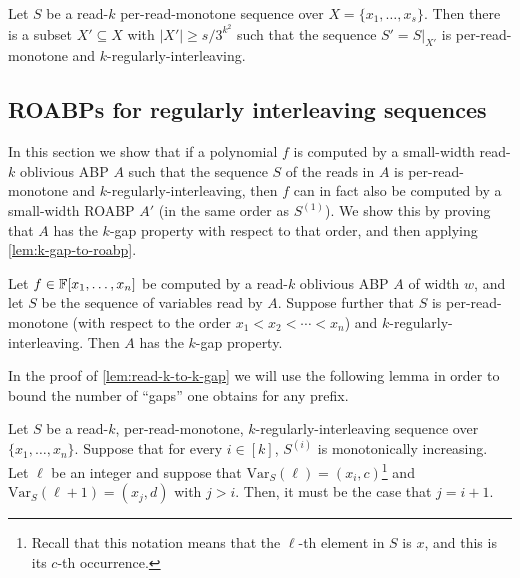 \documentclass[11pt]{article}
\newcommand{\var}[2]{\mathrm{Var}_{#1}({#2})}
\begin{document}
\begin{corollarywp}
\label{cor:k-per-read-regular}
Let $S$ be a read-$k$ per-read-monotone sequence over $X=\{x_1, \ldots, x_s\}$. Then there is a subset $X' \subseteq X$ with $|X'| \ge s/3^{k^2}$ such that the sequence $S' = S|_{X'}$ is per-read-monotone and $k$-regularly-interleaving.
\end{corollarywp}

\subsection{ROABPs for regularly interleaving sequences}
In this section we show that if a polynomial $f$ is computed by a small-width read-$k$ oblivious ABP $A$ such that the sequence $S$ of the reads in $A$ is per-read-monotone and $k$-regularly-interleaving, then $f$ can in fact also be computed by a small-width ROABP $A'$ (in the same order as $S^{(1)}$). We show this by proving that $A$ has the $k$-gap property with respect to that order, and then applying \autoref{lem:k-gap-to-roabp}. 


\begin{lemma}
\label{lem:read-k-to-k-gap}
Let $f \in \F[x_1, \ldots, x_n]$ be computed by a read-$k$ oblivious ABP $A$ of width $w$, and let $S$ be the sequence of variables read by $A$. Suppose further that $S$ is per-read-monotone (with respect to the order $x_1 < x_2 < \cdots < x_n$) and $k$-regularly-interleaving. Then $A$ has the $k$-gap property.
\end{lemma} 

In the proof of \autoref{lem:read-k-to-k-gap} we will use the following lemma in order to bound the number of ``gaps'' one obtains for any prefix.

\begin{lemma}
\label{lem:k-gap-interface}
Let $S$ be a read-$k$, per-read-monotone, $k$-regularly-interleaving sequence over $\{x_1, \ldots, x_n\}$. Suppose that for every $i \in [k]$, $S^{(i)}$ is monotonically increasing. Let $\ell$ be an integer and suppose that $\var{S}{\ell}=(x_i, c)$\footnote{Recall that this notation means that the $\ell$-th element in $S$ is $x$, and this is its $c$-th occurrence.} and $\var{S}{\ell+1} = (x_j, d)$ with $j>i$. Then, it must be the case that $j=i+1$.
\end{lemma}
\end{document}
